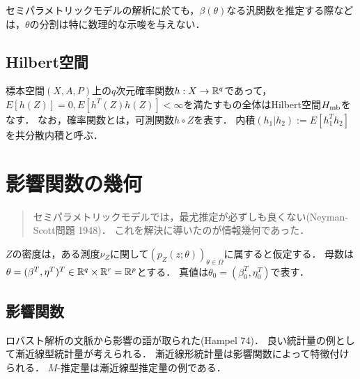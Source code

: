 \documentclass[uplatex,dvipdfmx]{jsreport}
\begin{document}
セミパラメトリックモデルの解析に於ても，$\beta(\theta)$なる汎関数を推定する際などは，$\theta$の分割は特に数理的な示唆を与えない．

\section{Hilbert空間}

\begin{example}
    標本空間$(X,A,P)$上の$q$次元確率関数$h:X\to\mathbb{R}^q$であって，$E[h(Z)]=0,E[h^T(Z)h(Z)]<\infty$を満たすもの全体はHilbert空間$H_{\mathrm{mb}}$をなす．
    なお，確率関数とは，可測関数$h\circ Z$を表す．
    内積$(h_1|h_2):=E[h_1^Th_2]$を共分散内積と呼ぶ．
\end{example}

\chapter{影響関数の幾何}

\begin{quotation}
    セミパラメトリックモデルでは，最尤推定が必ずしも良くない(Neyman-Scott問題 1948)．
    これを解決に導いたのが情報幾何であった．
\end{quotation}

\begin{notation}
    $Z$の密度は，ある測度$\nu_Z$に関して$(p_Z(z;\theta))_{\theta\in\Omega}$に属すると仮定する．
    母数は$\theta=(\beta^T,\eta^T)^T\in\mathbb{R}^q\times\mathbb{R}^r=\mathbb{R}^p$とする．
    真値は$\theta_0=(\beta_0^T,\eta^T_0)$で表す．
\end{notation}

\section{影響関数}

\begin{tcolorbox}[colframe=ForestGreen, colback=ForestGreen!10!white,breakable,colbacktitle=ForestGreen!40!white,coltitle=black,fonttitle=\bfseries\sffamily,
title=]
    ロバスト解析の文脈から影響の語が取られた(Hampel 74)．
    良い統計量の例として漸近線型統計量が考えられる．
    漸近線形統計量は影響関数によって特徴付けられる．
    $M$-推定量は漸近線型推定量の例である．
\end{tcolorbox}
\end{document}

